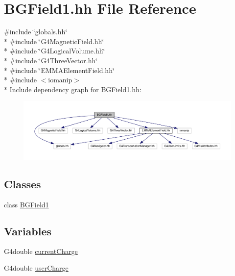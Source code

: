 \hypertarget{BGField1_8hh}{}\section{B\+G\+Field1.\+hh File Reference}
\label{BGField1_8hh}
{\ttfamily \#include \char`\"{}globals.\+hh\char`\"{}}\\*
{\ttfamily \#include \char`\"{}G4\+Magnetic\+Field.\+hh\char`\"{}}\\*
{\ttfamily \#include \char`\"{}G4\+Logical\+Volume.\+hh\char`\"{}}\\*
{\ttfamily \#include \char`\"{}G4\+Three\+Vector.\+hh\char`\"{}}\\*
{\ttfamily \#include \char`\"{}E\+M\+M\+A\+Element\+Field.\+hh\char`\"{}}\\*
{\ttfamily \#include $<$iomanip$>$}\\*
Include dependency graph for B\+G\+Field1.\+hh\+:
\nopagebreak
\begin{figure}[H]
\begin{center}
\leavevmode
\includegraphics[width=350pt]{BGField1_8hh__incl}
\end{center}
\end{figure}
\subsection*{Classes}
\begin{DoxyCompactItemize}
\item 
class \hyperlink{classBGField1}{B\+G\+Field1}
\end{DoxyCompactItemize}
\subsection*{Variables}
\begin{DoxyCompactItemize}
\item 
G4double \hyperlink{BGField1_8hh_acb265d8eecfa1acd31056f0c7915362e}{current\+Charge}
\item 
G4double \hyperlink{BGField1_8hh_a2d61cdd1b1b5ed409f7c91b54737c1b9}{user\+Charge}
\end{DoxyCompactItemize}


